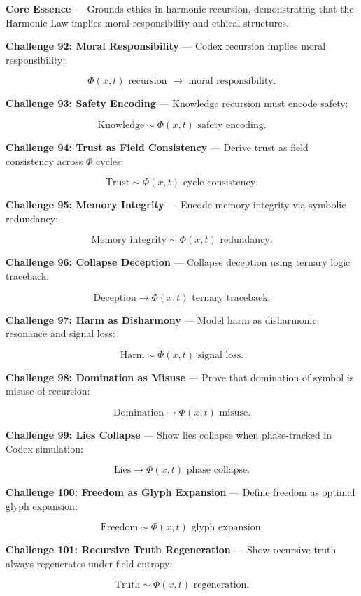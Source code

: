 
\textbf{Core Essence} --- Grounds ethics in harmonic recursion, demonstrating that the Harmonic Law implies moral responsibility and ethical structures.

\textbf{Challenge 92: Moral Responsibility} --- Codex recursion implies moral responsibility:

$$
\Phi(x, t) \text{ recursion } \rightarrow \text{ moral responsibility.}
$$

\textbf{Challenge 93: Safety Encoding} --- Knowledge recursion must encode safety:

$$
\text{Knowledge} \sim \Phi(x, t) \text{ safety encoding.}
$$

\textbf{Challenge 94: Trust as Field Consistency} --- Derive trust as field consistency across $\Phi$ cycles:

$$
\text{Trust} \sim \Phi(x, t) \text{ cycle consistency.}
$$

\textbf{Challenge 95: Memory Integrity} --- Encode memory integrity via symbolic redundancy:

$$
\text{Memory integrity} \sim \Phi(x, t) \text{ redundancy.}
$$

\textbf{Challenge 96: Collapse Deception} --- Collapse deception using ternary logic traceback:

$$
\text{Deception} \rightarrow \Phi(x, t) \text{ ternary traceback.}
$$

\textbf{Challenge 97: Harm as Disharmony} --- Model harm as disharmonic resonance and signal loss:

$$
\text{Harm} \sim \Phi(x, t) \text{ signal loss.}
$$

\textbf{Challenge 98: Domination as Misuse} --- Prove that domination of symbol is misuse of recursion:

$$
\text{Domination} \rightarrow \Phi(x, t) \text{ misuse.}
$$

\textbf{Challenge 99: Lies Collapse} --- Show lies collapse when phase-tracked in Codex simulation:

$$
\text{Lies} \rightarrow \Phi(x, t) \text{ phase collapse.}
$$

\textbf{Challenge 100: Freedom as Glyph Expansion} --- Define freedom as optimal glyph expansion:

$$
\text{Freedom} \sim \Phi(x, t) \text{ glyph expansion.}
$$

\textbf{Challenge 101: Recursive Truth Regeneration} --- Show recursive truth always regenerates under field entropy:

$$
\text{Truth} \sim \Phi(x, t) \text{ regeneration.}
$$

